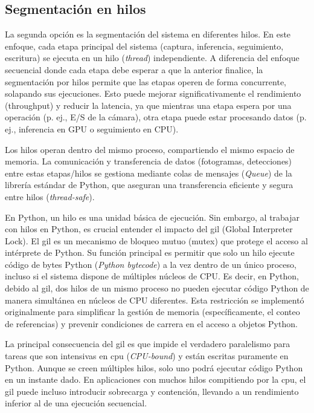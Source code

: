\documentclass[11pt,spanish,listoffigures,listoftables]{tfgetsinf}
\begin{document}
\subsection{Segmentación en hilos} \label{sub:segmentacion_hilos}

La segunda opción es la segmentación del sistema en diferentes hilos. En este enfoque, cada etapa principal del sistema (captura, inferencia, seguimiento, escritura) se ejecuta en un hilo (\textit{thread}) independiente. A diferencia del enfoque secuencial donde cada etapa debe esperar a que la anterior finalice, la segmentación por hilos permite que las etapas operen de forma concurrente, solapando sus ejecuciones. Esto puede mejorar significativamente el rendimiento (throughput) y reducir la latencia, ya que mientras una etapa espera por una operación (p. ej., E/S de la cámara), otra etapa puede estar procesando datos (p. ej., inferencia en GPU o seguimiento en CPU). 

Los hilos operan dentro del mismo proceso, compartiendo el mismo espacio de memoria. La comunicación y transferencia de datos (fotogramas, detecciones) entre estas etapas/hilos se gestiona mediante colas de mensajes (\textit{Queue}) de la librería estándar de Python, que aseguran una transferencia eficiente y segura entre hilos (\textit{thread-safe}).


En Python, un hilo es una unidad básica de ejecución. Sin embargo, al trabajar con hilos en Python, es crucial entender el impacto del \gls{gil} (Global Interpreter Lock). El \gls{gil} es un mecanismo de bloqueo mutuo (mutex) que protege el acceso al intérprete de Python. Su función principal es permitir que solo un hilo ejecute código de bytes Python (\textit{Python bytecode}) a la vez dentro de un único proceso, incluso si el sistema dispone de múltiples núcleos de CPU. Es decir, en Python, debido al \gls{gil}, dos hilos de un mismo proceso no pueden ejecutar código Python de manera simultánea en núcleos de CPU diferentes. Esta restricción se implementó originalmente para simplificar la gestión de memoria (específicamente, el conteo de referencias) y prevenir condiciones de carrera en el acceso a objetos Python.

La principal consecuencia del \gls{gil} es que impide el verdadero paralelismo para tareas que son intensivas en \gls{cpu} (\textit{CPU-bound}) y están escritas puramente en Python. Aunque se creen múltiples hilos, solo uno podrá ejecutar código Python en un instante dado. En aplicaciones con muchos hilos compitiendo por la \gls{cpu}, el \gls{gil} puede incluso introducir sobrecarga y contención, llevando a un rendimiento inferior al de una ejecución secuencial.
\end{document}

